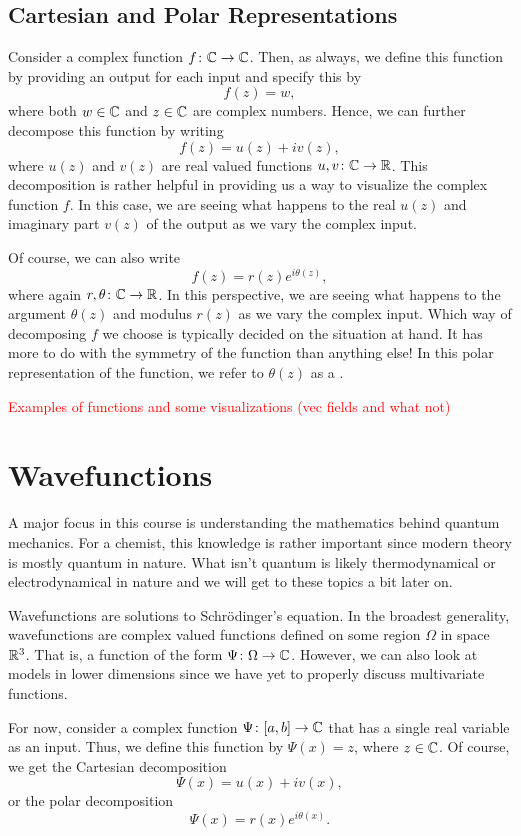 \subsection{Cartesian and Polar Representations}

Consider a complex function $f\colon \mathbb{C} \to \mathbb{C}$.  Then, as always, we define this function by providing an output for each input and specify this by
\[
f(z)=w,
\]
where both $w\in \mathbb{C}$ and $z\in \mathbb{C}$ are complex numbers.  Hence, we can further decompose this function by writing
\[
f(z)=u(z)+iv(z),
\]
where $u(z)$ and $v(z)$ are real valued functions $u,v\colon \mathbb{C} \to \mathbb{R}$.  This decomposition is rather helpful in providing us a way to visualize the complex function $f$.  In this case, we are seeing what happens to the real $u(z)$ and imaginary part $v(z)$ of the output as we vary the complex input.

Of course, we can also write
\[
f(z)=r(z)e^{i\theta(z)},
\]
where again $r,\theta \colon \mathbb{C} \to \mathbb{R}$.  In this perspective, we are seeing what happens to the argument $\theta(z)$ and modulus $r(z)$ as we vary the complex input.  Which way of decomposing $f$ we choose is typically decided on the situation at hand.  It has more to do with the symmetry of the function than anything else! In this polar representation of the function, we refer to $\theta(z)$ as a .  

\textcolor{red}{Examples of functions and some visualizations (vec fields and what not)}

\section{Wavefunctions}

A major focus in this course is understanding the mathematics behind quantum mechanics.  For a chemist, this knowledge is rather important since modern theory is mostly quantum in nature.  What isn't quantum is likely thermodynamical or electrodynamical in nature and we will get to these topics a bit later on. 

Wavefunctions are solutions to Schr\"odinger's equation.  In the broadest generality, wavefunctions are complex valued functions defined on some region $\Omega$ in space $\mathbb{R}^3$. That is, a function of the form $\Psi\colon \Omega \to \mathbb{C}$. However, we can also look at models in lower dimensions since we have yet to properly discuss multivariate functions.  

For now, consider a complex function $\Psi\colon [a,b] \to \mathbb{C}$ that has a single real variable as an input.  Thus, we define this function by $\Psi(x)=z$, where $z\in \mathbb{C}$.  Of course, we get the Cartesian decomposition
\[
\Psi(x)=u(x)+iv(x),
\]
or the polar decomposition
\[
\Psi(x)=r(x)e^{i\theta(x)}.
\]

